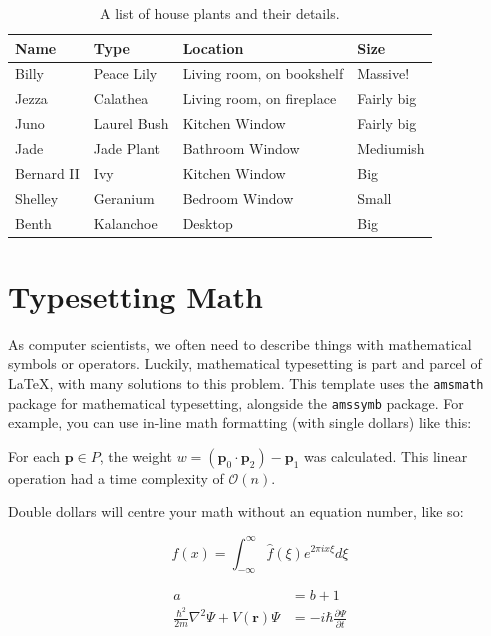 \begin{table}[htb]
\centering
\caption{A list of house plants and their details.}
\begin{tabular}{l|l|l|l}
\textbf{Name} & \textbf{Type} & \textbf{Location}         & \textbf{Size} \\
\hline\hline
Billy         & Peace Lily    & Living room, on bookshelf & Massive!      \\
Jezza         & Calathea      & Living room, on fireplace & Fairly big    \\
Juno          & Laurel Bush   & Kitchen Window            & Fairly big    \\
Jade          & Jade Plant    & Bathroom Window           & Mediumish     \\
Bernard II    & Ivy           & Kitchen Window            & Big           \\
Shelley       & Geranium      & Bedroom Window            & Small        \\
Benth         & Kalanchoe     & Desktop                   & Big
\end{tabular}
\label{tbl:example-table}
\end{table}

\section{Typesetting Math}
As computer scientists, we often need to describe things with mathematical symbols or operators. Luckily, mathematical typesetting is part and parcel of \LaTeX, with many solutions to this problem. This template uses the \texttt{amsmath} package for mathematical typesetting, alongside the \texttt{amssymb} package. For example, you can use in-line math formatting (with single dollars) like this:

\begin{framed}
For each $\mathbf{p} \in P$, the weight $w = \left( \mathbf{p}_0 \cdot \mathbf{p}_2 \right) - \mathbf{p}_1$ was calculated. This linear operation had a time complexity of $\mathcal{O}(n)$.
\end{framed}

Double dollars will centre your math without an equation number, like so:

\begin{framed}
$$ f(x) = \int_{-\infty}^{\infty}{\hat{f}(\xi)e^{2\pi i x \xi}d\xi} $$
\end{framed}

\begin{framed}
\begin{align}
a &= b + 1 
\label{eqn:example1} \\
\frac{\hbar^2}{2m}\nabla^2\Psi + V(\mathbf{r})\Psi
&= -i\hbar \frac{\partial\Psi}{\partial t}    
\label{eqn:example2}
\end{align}
\end{framed}

